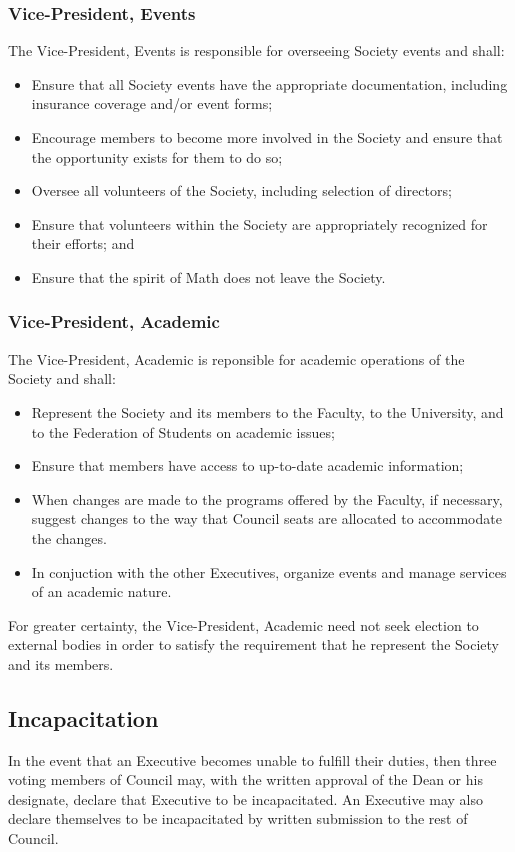 \subsubsection{Vice-President, Events}
The Vice-President, Events is responsible for overseeing Society events and
shall:
\begin{itemize}
  \item Ensure that all Society events have the appropriate documentation,
    including insurance coverage and/or event forms;
  \item Encourage members to become more involved in the Society and ensure that
    the opportunity exists for them to do so;
  \item Oversee all volunteers of the Society, including selection of directors;
  \item Ensure that volunteers within the Society are appropriately recognized
    for their efforts; and
  \item Ensure that the spirit of Math does not leave the Society.
\end{itemize}

\subsubsection{Vice-President, Academic}
The Vice-President, Academic is reponsible for academic operations of the
Society and shall:
\begin{itemize}
  \item Represent the Society and its members to the Faculty, to the University,
    and to the Federation of Students on academic issues;
  \item Ensure that members have access to up-to-date academic information;
  \item When changes are made to the programs offered by the Faculty, if
    necessary, suggest changes to the way that Council seats are allocated to
    accommodate the changes.
  \item In conjuction with the other Executives, organize events and manage
    services of an academic nature.
\end{itemize}

For greater certainty, the Vice-President, Academic need not seek election to
external bodies in order to satisfy the requirement that he represent the
Society and its members.

\subsection{Incapacitation}
In the event that an Executive becomes unable to fulfill their duties, then
three voting members of Council may, with the written approval of the Dean or
his designate, declare that Executive to be incapacitated. An Executive may also
declare themselves to be incapacitated by written submission to the rest of
Council.

